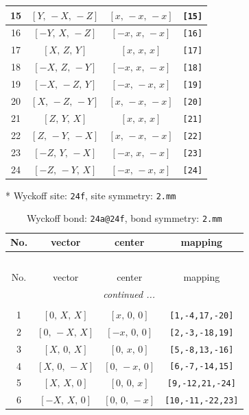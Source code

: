 \documentclass[fleqn,8pt]{jsarticle}
\begin{document}
\begin{longtable}{cccc}
15 & $\left[ Y,\, - X,\, - Z \right]$ & $\left[ x,\, - x,\, - x \right]$ & {\tt [15]} \\ \hline
16 & $\left[ - Y,\, X,\, - Z \right]$ & $\left[ - x,\, x,\, - x \right]$ & {\tt [16]} \\ \hline
17 & $\left[ X,\, Z,\, Y \right]$ & $\left[ x,\, x,\, x \right]$ & {\tt [17]} \\ \hline
18 & $\left[ - X,\, Z,\, - Y \right]$ & $\left[ - x,\, x,\, - x \right]$ & {\tt [18]} \\ \hline
19 & $\left[ - X,\, - Z,\, Y \right]$ & $\left[ - x,\, - x,\, x \right]$ & {\tt [19]} \\ \hline
20 & $\left[ X,\, - Z,\, - Y \right]$ & $\left[ x,\, - x,\, - x \right]$ & {\tt [20]} \\ \hline
21 & $\left[ Z,\, Y,\, X \right]$ & $\left[ x,\, x,\, x \right]$ & {\tt [21]} \\ \hline
22 & $\left[ Z,\, - Y,\, - X \right]$ & $\left[ x,\, - x,\, - x \right]$ & {\tt [22]} \\ \hline
23 & $\left[ - Z,\, Y,\, - X \right]$ & $\left[ - x,\, x,\, - x \right]$ & {\tt [23]} \\ \hline
24 & $\left[ - Z,\, - Y,\, X \right]$ & $\left[ - x,\, - x,\, x \right]$ & {\tt [24]} \\
\end{longtable}
* Wyckoff site: {\tt 24f}, site symmetry: {\tt 2.mm}
\renewcommand{\arraystretch}{1.2}
\begin{longtable}{cccc}
\caption{Wyckoff bond: {\tt 24a@24f}, bond symmetry: {\tt 2.mm}}
 \\
 \hline \hline
No. & vector & center & mapping \\ \hline \endfirsthead

\multicolumn{3}{l}{\tablename\ \thetable{}} \\
 \hline \hline
No. & vector & center & mapping \\ \hline \endhead

 \hline \hline
\multicolumn{3}{r}{\footnotesize\it continued ...} \\ \endfoot

 \hline \hline
\multicolumn{3}{r}{} \\ \endlastfoot

1 & $\left[ 0,\, X,\, X \right]$ & $\left[ x,\, 0,\, 0 \right]$ & {\tt [1,-4,17,-20]} \\ \hline
2 & $\left[ 0,\, - X,\, X \right]$ & $\left[ - x,\, 0,\, 0 \right]$ & {\tt [2,-3,-18,19]} \\ \hline
3 & $\left[ X,\, 0,\, X \right]$ & $\left[ 0,\, x,\, 0 \right]$ & {\tt [5,-8,13,-16]} \\ \hline
4 & $\left[ X,\, 0,\, - X \right]$ & $\left[ 0,\, - x,\, 0 \right]$ & {\tt [6,-7,-14,15]} \\ \hline
5 & $\left[ X,\, X,\, 0 \right]$ & $\left[ 0,\, 0,\, x \right]$ & {\tt [9,-12,21,-24]} \\ \hline
6 & $\left[ - X,\, X,\, 0 \right]$ & $\left[ 0,\, 0,\, - x \right]$ & {\tt [10,-11,-22,23]} \\
\end{longtable}
\end{document}

